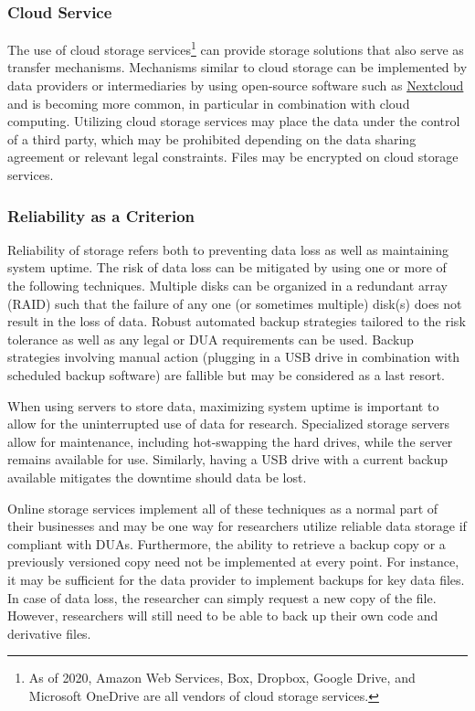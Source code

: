 \hypertarget{cloud-service}{%
\subsubsection{Cloud Service}\label{cloud-service}}

The use of cloud storage services\footnote{As of 2020, Amazon Web Services, Box, Dropbox, Google Drive, and Microsoft OneDrive are all vendors of cloud storage services.} can provide storage solutions that also serve as transfer mechanisms. Mechanisms similar to cloud storage can be implemented by data providers or intermediaries by using open-source software such as \href{https://nextcloud.com}{Nextcloud} and is becoming more common, in particular in combination with cloud computing. Utilizing cloud storage services may place the data under the control of a third party, which may be prohibited depending on the data sharing agreement or relevant legal constraints. Files may be encrypted on cloud storage services.

\hypertarget{reliability-as-a-criterion}{%
\subsubsection{Reliability as a Criterion}\label{reliability-as-a-criterion}}

Reliability of storage refers both to preventing data loss as well as maintaining system uptime. The risk of data loss can be mitigated by using one or more of the following techniques. Multiple disks can be organized in a redundant array (RAID) such that the failure of any one (or sometimes multiple) disk(s) does not result in the loss of data. Robust automated backup strategies tailored to the risk tolerance as well as any legal or DUA requirements can be used. Backup strategies involving manual action (plugging in a USB drive in combination with scheduled backup software) are fallible but may be considered as a last resort.

When using servers to store data, maximizing system uptime is important to allow for the uninterrupted use of data for research. Specialized storage servers allow for maintenance, including hot-swapping the hard drives, while the server remains available for use. Similarly, having a USB drive with a current backup available mitigates the downtime should data be lost.

Online storage services implement all of these techniques as a normal part of their businesses and may be one way for researchers utilize reliable data storage if compliant with DUAs. Furthermore, the ability to retrieve a backup copy or a previously versioned copy need not be implemented at every point. For instance, it may be sufficient for the data provider to implement backups for key data files. In case of data loss, the researcher can simply request a new copy of the file. However, researchers will still need to be able to back up their own code and derivative files.

